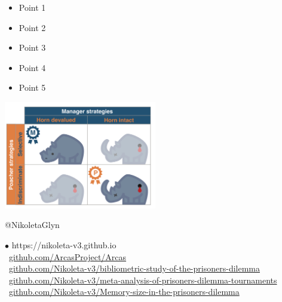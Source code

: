 \documentclass{beamer}
\begin{document}
\begin{frame}
    \begin{center}
        \begin{itemize}
            \item Point 1
            \item Point 2
            \item Point 3
            \item Point 4
            \item Point 5
        \end{itemize}
    \end{center}
\end{frame}

\begin{frame}
    \begin{center}
    \includegraphics[width=0.5\textwidth]{static/RhinoPic.pdf}\hspace{10pt}
    
    \end{center}
\end{frame}

\begin{frame}
    \begin{center}
    \faTwitter @NikoletaGlyn \\
    
    \vspace{1cm}
    \end{center}

    \footnotesize
    $\bullet$ https://nikoleta-v3.github.io \\
    \faGithub \ \url{github.com/ArcasProject/Arcas} \\
    \faGithub \ \url{github.com/Nikoleta-v3/bibliometric-study-of-the-prisoners-dilemma} \\
    \faGithub \ \url{github.com/Nikoleta-v3/meta-analysis-of-prisoners-dilemma-tournaments} \\
    \faGithub \ \url{github.com/Nikoleta-v3/Memory-size-in-the-prisoners-dilemma} \\
\end{frame}
\end{document}
